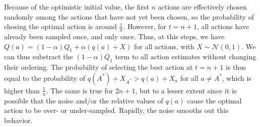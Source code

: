 Because of the optimistic initial value, the first $n$ actions are effectively chosen randomly among the actions that have not yet been chosen, so the probability of chosing the optimal action is around $\frac{1}{n}$.
However, for $t = n+1$, all actions have already been sampled once, and only once.
Thus, at this steps, we have $Q(a) = (1 - \alpha) Q_1 + \alpha (q(a) + X)$ for all actions, with $X \sim \mathcal{N}(0,1)$.
We can thus substract the $(1-\alpha)Q_1$ term to all action estimates without changing their ordering.
The probability of selecting the best action at $t = n+1$ is thus equal to the probability of $q(A^*) + X_{A^*} > q(a) + X_a$ for all $a \neq A^*$, which is higher than $\frac{1}{n}$.
The same is true for $2n+1$, but to a lesser extent since it is possible that the noise and/or the relative values of $q(a)$ cause the optimal action to be over- or under-sampled.
Rapidly, the noise smooths out this behavior.


